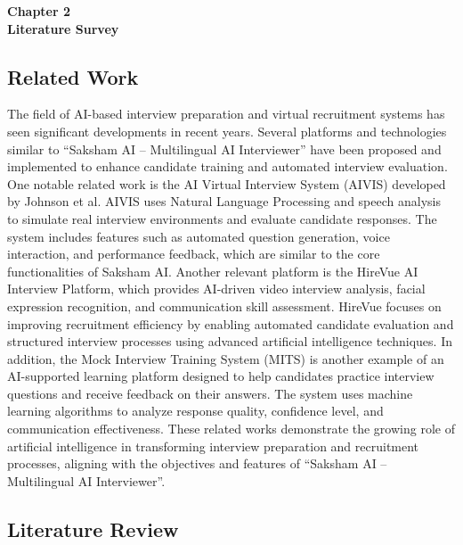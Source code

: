 \documentclass[12pt]{article}
\begin{document}
\vspace*{\fill}
\begin{center}
{\Large \bf Chapter 2} \\[2em]
{\Large \bf Literature Survey}
\end{center}
\vspace*{\fill}
\newpage

\setcounter{section}{2}

\subsection{Related Work}
\vspace{10pt}

\noindent The field of AI-based interview preparation and virtual recruitment systems has seen significant developments in recent years. Several platforms and technologies similar to “Saksham AI – Multilingual AI Interviewer” have been proposed and implemented to enhance candidate training and automated interview evaluation.
One notable related work is the AI Virtual Interview System (AIVIS) developed by Johnson et al. AIVIS uses Natural Language Processing and speech analysis to simulate real interview environments and evaluate candidate responses. The system includes features such as automated question generation, voice interaction, and performance feedback, which are similar to the core functionalities of Saksham AI.
Another relevant platform is the HireVue AI Interview Platform, which provides AI-driven video interview analysis, facial expression recognition, and communication skill assessment. HireVue focuses on improving recruitment efficiency by enabling automated candidate evaluation and structured interview processes using advanced artificial intelligence techniques.
In addition, the Mock Interview Training System (MITS) is another example of an AI-supported learning platform designed to help candidates practice interview questions and receive feedback on their answers. The system uses machine learning algorithms to analyze response quality, confidence level, and communication effectiveness.
These related works demonstrate the growing role of artificial intelligence in transforming interview preparation and recruitment processes, aligning with the objectives and features of “Saksham AI – Multilingual AI Interviewer”.


\newpage

\subsection{Literature Review}
\end{document}
